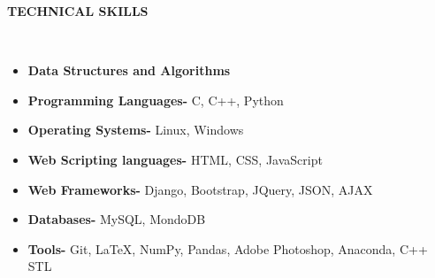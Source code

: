\documentclass[a4paper,10pt]{article}
\newcommand{\lsep}{-0.5cm}
\newcommand{\resheading}[1]{{\small \colorbox{mygrey}{\begin{minipage}{0.975\textwidth}{\textbf{#1 \vphantom{p\^{E}}}}\end{minipage}}}}
\begin{document}
\resheading{\textbf{TECHNICAL SKILLS} }\\[\lsep]
\begin{itemize}
\item \noindent \textbf{Data Structures and Algorithms} 
\end{itemize}
\begin{itemize}
\item \noindent \textbf{Programming Languages-}  C, C++, Python
\end{itemize}
\begin{itemize}
\item \noindent\textbf{ Operating Systems-}  Linux, Windows
\end{itemize}
\begin{itemize}
\item \noindent \textbf{ Web Scripting languages- }  HTML, CSS, JavaScript
\end{itemize}
\begin{itemize}
\item \noindent\textbf{ Web Frameworks-}  Django, Bootstrap, JQuery, JSON, AJAX
\end{itemize}
\begin{itemize}
\item \noindent\textbf{ Databases-}  MySQL, MondoDB
\end{itemize}
\begin{itemize}
\item \noindent\textbf{ Tools-}  Git, \LaTeX, NumPy, Pandas, Adobe Photoshop, Anaconda, C++ STL
\end{itemize}
\end{document}
